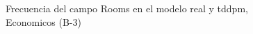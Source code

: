 \begin{figure}[H]
    \centering
    
    \caption{Frecuencia del campo Rooms en el modelo real y tddpm, Economicos (B-3)}
    \label{frecuency-Rooms-tddpm_mlp}
\end{figure}